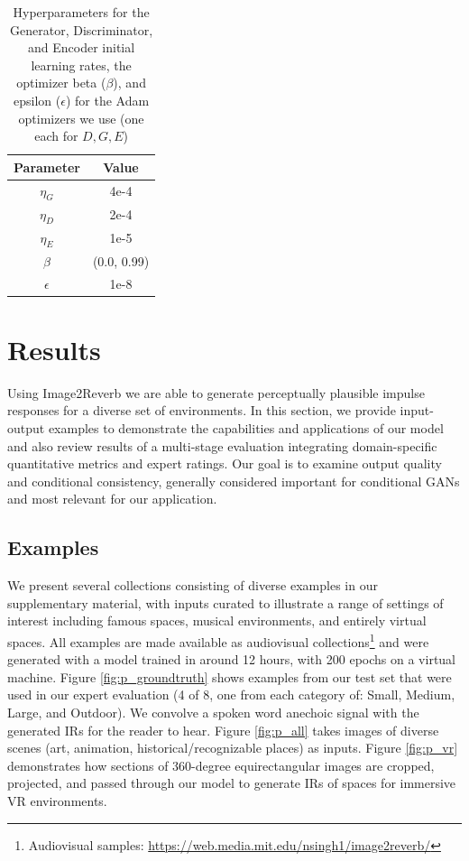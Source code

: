 \documentclass[10pt,twocolumn,letterpaper]{article}
\begin{document}
\begin{table}[ht]
    \small
    \centering
    \begin{tabular}{c|c}
        Parameter & Value\\
        \hline
        $\eta_G$ & 4e-4\\
        $\eta_D$ & 2e-4\\
        $\eta_E$ & 1e-5\\
        $\beta$ & (0.0, 0.99)\\
        $\epsilon$ & 1e-8\\
    \end{tabular}
    \caption{Hyperparameters for the Generator, Discriminator, and Encoder initial learning rates, the optimizer beta ($\beta$), and epsilon ($\epsilon$) for the Adam optimizers we use (one each for $D, G, E$)}
    \label{tab:hyperparameters}
\end{table}

\section{Results}
Using Image2Reverb we are able to generate perceptually plausible impulse responses for a diverse set of environments. In this section, we provide input-output examples to demonstrate the capabilities and applications of our model and also review results of a multi-stage evaluation integrating domain-specific quantitative metrics and expert ratings. Our goal is to examine output quality and conditional consistency, generally considered important for conditional GANs \cite{devries2020on} and most relevant for our application.

\subsection{Examples}
We present several collections consisting of diverse examples in our supplementary material, with inputs curated to illustrate a range of settings of interest including famous spaces, musical environments, and entirely virtual spaces. All examples are made available as audiovisual collections\footnote{Audiovisual samples: \href{https://web.media.mit.edu/~nsingh1/image2reverb/}{https://web.media.mit.edu/\raisebox{0.5ex}{\texttildelow}nsingh1/image2reverb/}} and were generated with a model trained in around 12 hours, with 200 epochs on a virtual machine. Figure \ref{fig:p_groundtruth} shows examples from our test set that were used in our expert evaluation (4 of 8, one from each category of: Small, Medium, Large, and Outdoor). We convolve a spoken word anechoic signal with the generated IRs for the reader to hear. Figure \ref{fig:p_all} takes images of diverse scenes (art, animation, historical/recognizable places) as inputs. Figure \ref{fig:p_vr} demonstrates how sections of 360-degree equirectangular images are cropped, projected, and passed through our model to generate IRs of spaces for immersive VR environments.
\end{document}
